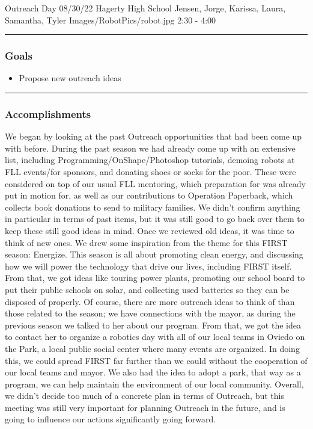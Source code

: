 \insertmeeting 
	{Outreach Day} 
	{08/30/22}
	{Hagerty High School}
	{Jensen, Jorge, Karissa, Laura, Samantha, Tyler}
	{Images/RobotPics/robot.jpg}
	{2:30 - 4:00}
	
\noindent\hfil\rule{\textwidth}{.4pt}\hfil
\subsubsection*{Goals}
\begin{itemize}
    \item Propose new outreach ideas

\end{itemize} 

\noindent\hfil\rule{\textwidth}{.4pt}\hfil

\subsubsection*{Accomplishments}
We began by looking at the past Outreach opportunities that had been come up with before. During the past season we had already come up with an extensive list, including Programming/OnShape/Photoshop tutorials, demoing robots at FLL events/for sponsors, and donating shoes or socks for the poor. These were considered on top of our usual FLL mentoring, which preparation for was already put in motion for, as well as our contributions to Operation Paperback, which collects book donations to send to military families. We didn't confirm anything in particular in terms of past items, but it was still good to go back over them to keep these still good ideas in mind. 
Once we reviewed old ideas, it was time to think of new ones. We drew some inspiration from the theme for this FIRST season: Energize. This season is all about promoting clean energy, and discussing how we will power the technology that drive our lives, including FIRST itself. From that, we got ideas like touring power plants, promoting our school board to put their public schools on solar, and collecting used batteries so they can be disposed of properly.
Of course, there are more outreach ideas to think of than those related to the season; we have connections with the mayor, as during the previous season we talked to her about our program. From that, we got the idea to contact her to organize a robotics day with all of our local teams in Oviedo on the Park, a local public social center where many events are organized. In doing this, we could spread FIRST far further than we could without the cooperation of our local teams and mayor. We also had the idea to adopt a park, that way as a program, we can help maintain the environment of our local community.
Overall, we didn't decide too much of a concrete plan in terms of Outreach, but this meeting was still very important for planning Outreach in the future, and is going to influence our actions significantly going forward.


